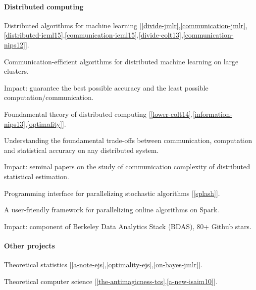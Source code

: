 \documentclass{res}
\newenvironment{my_item}{
\begin{itemize}
  \setlength{\itemsep}{0pt}
  \setlength{\parskip}{0pt}
  \setlength{\parsep}{0pt}}
{\end{itemize}
}
\begin{document}
\begin{resume}
\vspace{-10pt}
\paragraph{Distributed computing}
\begin{my_item}
\item Distributed algorithms for machine learning [\ref{divide-jmlr},\ref{communication-jmlr},\ref{distributed-icml15},\ref{communication-icml15},\ref{divide-colt13},\ref{communication-nips12}].
\begin{my_item}
\item Communication-efficient algorithms for distributed machine learning on large clusters.
\item Impact: guarantee the best possible accuracy and the least possible computation/communication.
\end{my_item}
\item Foundamental theory of distributed computing [\ref{lower-colt14},\ref{information-nips13},\ref{optimality}].
\begin{my_item}
\item Understanding the foundamental trade-offs between communication, computation and statistical accuracy on any distributed system.
\item Impact: seminal papers on the study of communication complexity of distributed statistical estimation.
\end{my_item}
\item Programming interface for parallelizing stochastic algorithms [\ref{splash}].
\begin{my_item}
\item A user-friendly framework for parallelizing online algorithms on Spark.
\item Impact: component of Berkeley Data Analytics Stack (BDAS), 80+ Github stars.
\end{my_item}
\end{my_item}

\vspace{-10pt}
\paragraph{Other projects}
\begin{my_item}
\item Theoretical statistics [\ref{a-note-ejs},\ref{optimality-ejs},\ref{on-bayes-jmlr}].
\item Theoretical computer science [\ref{the-antimagicness-tcs},\ref{a-new-isaim10}].
\end{my_item}


\end{resume}
\end{document}
